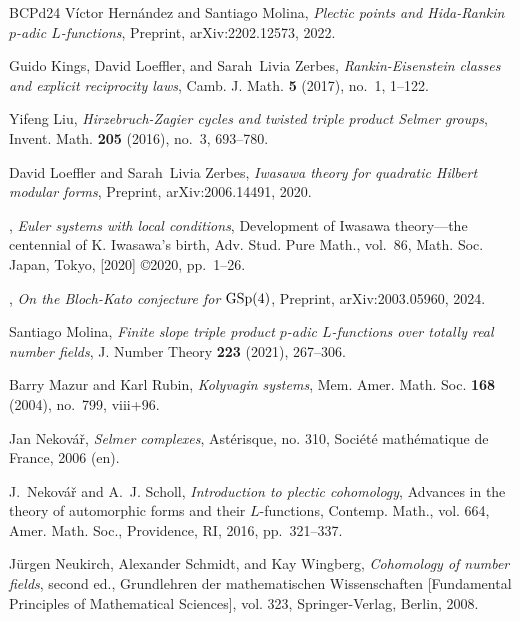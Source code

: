 \documentclass[10pt]{amsart}
\numberwithin{equation}{section}
\theoremstyle{definition}
\theoremstyle{remark} %
\begin{document}
\begin{thebibliography}{BCPd24}
Víctor Hernández and Santiago Molina, \emph{Plectic points and {H}ida-{R}ankin $p$-adic {$L$}-functions}, Preprint, {arXiv}:2202.12573, 2022.

Guido Kings, David Loeffler, and Sarah~Livia Zerbes, \emph{Rankin-{E}isenstein classes and explicit reciprocity laws}, Camb. J. Math. \textbf{5} (2017), no.~1, 1--122. 

Yifeng Liu, \emph{Hirzebruch-{Z}agier cycles and twisted triple product {S}elmer groups}, Invent. Math. \textbf{205} (2016), no.~3, 693--780. 

David Loeffler and Sarah~Livia Zerbes, \emph{Iwasawa theory for quadratic {H}ilbert modular forms}, Preprint, {arXiv}:2006.14491, 2020.

\bysame, \emph{Euler systems with local conditions}, Development of {I}wasawa theory---the centennial of {K}. {I}wasawa's birth, Adv. Stud. Pure Math., vol.~86, Math. Soc. Japan, Tokyo, [2020] \copyright 2020, pp.~1--26. 

\bysame, \emph{On the {B}loch-{K}ato conjecture for {${\rm GSp}(4)$}}, Preprint, {arXiv}:2003.05960, 2024.

Santiago Molina, \emph{Finite slope triple product {$p$}-adic {$L$}-functions over totally real number fields}, J. Number Theory \textbf{223} (2021), 267--306. 

Barry Mazur and Karl Rubin, \emph{Kolyvagin systems}, Mem. Amer. Math. Soc. \textbf{168} (2004), no.~799, viii+96. 

Jan Nekov\'a\v{r}, \emph{Selmer complexes}, Ast\'erisque, no. 310, Soci\'et\'e math\'ematique de France, 2006 (en). 

J.~Nekov\'a\v{r} and A.~J. Scholl, \emph{Introduction to plectic cohomology}, Advances in the theory of automorphic forms and their {$L$}-functions, Contemp. Math., vol. 664, Amer. Math. Soc., Providence, RI, 2016, pp.~321--337. 

J\"{u}rgen Neukirch, Alexander Schmidt, and Kay Wingberg, \emph{Cohomology of number fields}, second ed., Grundlehren der mathematischen Wissenschaften [Fundamental Principles of Mathematical Sciences], vol. 323, Springer-Verlag, Berlin, 2008. 


\end{thebibliography}
\end{document}
